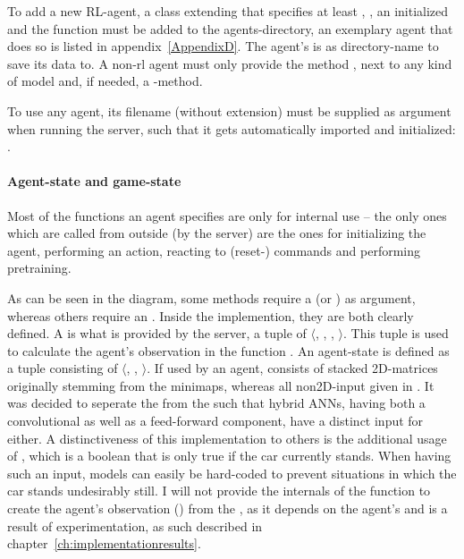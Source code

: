 To add a new RL-agent, a class extending  that specifies at least , , an initialized  and the function  must be added to the agents-directory, an exemplary agent that does so is listed in appendix~\ref{AppendixD}. The agent's  is as directory-name to save its data to. A non-rl agent must only provide the method , next to any kind of model and, if needed, a -method.

To use any agent, its filename (without extension) must be supplied as argument when running the server, such that it gets automatically imported and initialized: .

\paragraph{Agent-state and game-state}

Most of the functions an agent specifies are only for internal use -- the only ones which are called from outside (by the server) are the ones for initializing the agent, performing an action, reacting to (reset-) commands and performing pretraining.

As can be seen in the diagram, some methods require a  (or ) as argument, whereas others require an . Inside the implemention, they are both clearly defined. A  is what is provided by the server, a tuple of $\langle$, , , $\rangle$. This tuple is used to calculate the agent's observation in the function . An agent-state is defined as a tuple consisting of $\langle$, , $\rangle$. If used by an agent,  consists of stacked 2D-matrices originally stemming from the minimaps, whereas all non2D-input given in . It was decided to seperate the  from the  such that hybrid ANNs, having both a convolutional as well as a feed-forward component, have a distinct input for either. A distinctiveness of this implementation to others is the additional usage of , which is a boolean that is only true if the car currently stands. When having such an input, models can easily be hard-coded to prevent situations in which the car stands undesirably still. I will not provide the internals of the function to create the agent's observation () from the , as it depends on the agent's  and is a result of experimentation, as such described in chapter~\ref{ch:implementationresults}.

